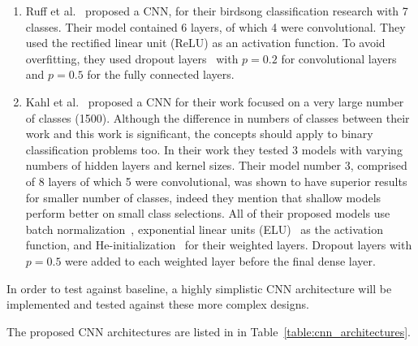 \begin{enumerate}

  \item Ruff et al.~\cite{ruff2020automated} proposed a  CNN, for their birdsong
    classification research with 7 classes. Their model contained
    6 layers, of which 4 were convolutional. They used the rectified linear unit
    (ReLU) as an activation function. To avoid overfitting, they used dropout
    layers~\cite{srivastava2014dropout} with $p=0.2$ for
    convolutional layers and $p=0.5$ for the fully connected layers.

  \item Kahl et al.~\cite{kahl2017large} proposed a CNN for their work focused
    on a very large number of classes (1500). Although the difference in numbers
    of classes between their work and this work is significant, the concepts
    should apply to binary classification problems too. In their work they
    tested 3 models with varying numbers of hidden layers and kernel sizes.
    Their model number 3, comprised of 8 layers of which 5 were convolutional,
    was shown to have superior results for smaller number of classes, indeed
    they mention that shallow models perform better on small class selections.
    All of their proposed models use batch normalization~\cite{ioffe2015batch},
    exponential linear units (ELU)~\cite{clevert2015fast} as the activation
    function, and He-initialization~\cite{he2015delving} for their weighted
    layers. Dropout layers with $p=0.5$ were added to each weighted layer before
    the final dense layer.


\end{enumerate}

In order to test against baseline, a highly simplistic CNN architecture will be
implemented and tested against these more complex designs. 

The proposed CNN architectures are listed in in
Table~\ref{table:cnn_architectures}.

